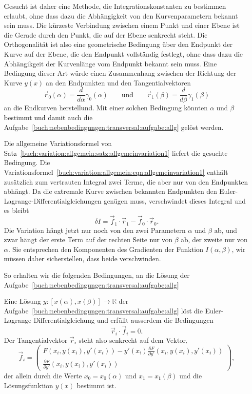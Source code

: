 Gesucht ist daher eine Methode, die Integrationskonstanten zu bestimmen
erlaubt, ohne dass dazu die Abhängigkeit von den Kurvenparametern bekannt
sein muss.
Die kürzeste Verbindung zwischen einem Punkt und einer Ebene ist die
Gerade durch den Punkt, die auf der Ebene senkrecht steht.
Die Orthogonalität ist also eine geometrische Bedingung über den Endpunkt
der Kurve auf der Ebene, die den Endpunkt vollständig festlegt, ohne dass
dazu die Abhängikgeit der Kurvenlänge vom Endpunkt bekannt sein muss.
Eine Bedingung dieser Art würde einen Zusammenhang zwischen der Richtung
der Kurve $y(x)$ an den Endpunkten und den Tangentialvektoren
\[
\vec{r}_0(\alpha)
=
\frac{d}{d\alpha}\gamma_0(\alpha)
\qquad\text{und}\qquad
\vec{r}_1(\beta)
=
\frac{d}{d\beta}\gamma_1(\beta)
\]
an die Endkurven herstellund.
Mit einer solchen Bedingung könnten $\alpha$ und $\beta$ bestimmt und
damit auch die
Aufgabe~\ref{buch:nebenbedingungen:transversal:aufgabe:allg}
gelöst werden.

Die allgemeine Variationsformel von
Satz~\ref{buch:variation:allgemein:satz:allgemeinvariation1}
liefert die gesuchte Bedingung.
Die Variationsformel~\eqref{buch:variation:allgemein:eqn:allgemeinvariation1}
enthält zusätzlich zum vertrauten Integral zwei Terme, die aber nur von
den Endpunkten abhängt.
Da die extremale Kurve zwischen bekannten Endpunkten den
Euler-Lagrange-Differentialgleichungen genügen muss, verschwindet dieses
Integral und es bleibt
\[
\delta I
=
\vec{f}_1\cdot\vec{r}_1 - \vec{f}_0\cdot\vec{r}_0.
\]
Die Variation hängt jetzt nur noch von den zwei Parametern
$\alpha$ und $\beta$ ab, und zwar hängt der erste Term auf der rechten
Seite nur von $\beta$ ab, der zweite nur von $\alpha$.
Sie entsprechen den Komponenten des Gradienten der Funktion
$I(\alpha,\beta)$, wir müssen daher sicherstellen, dass beide
verschwinden.

So erhalten wir die folgenden Bedingungen, an die Lösung der
Aufgabe~\ref{buch:nebenbedingungen:transversal:aufgabe:allg}

\begin{satz}[Transversalität]
\label{buch:nebenbedingungen:transversal:satz:transversal}
Eine Lösung $y\colon [x(\alpha),x(\beta)]\to \mathbb{R}$ der 
Aufgabe~\ref{buch:nebenbedingungen:transversal:aufgabe:allg}
löst die Euler-Lagrange-Differentialgleichung und erfüllt ausserdem
die Bedingungen
\begin{equation}
\vec{r}_i\cdot\vec{f}_i=0.
\end{equation}
Der Tangentialvektor $\vec{r}_i$ steht also senkrecht auf dem Vektor,
\begin{equation}
\vec{f}_i
=
\begin{pmatrix}
\displaystyle 
F(x_i, y(x_i),y'(x_i))-y'(x_i)\frac{\partial F}{\partial y'}(x_i,y(x_i),y'(x_i))
\\[3pt]
\displaystyle 
\frac{\partial F}{\partial y'}(x_i,y(x_i),y'(x_i))
\end{pmatrix},
\end{equation}
der allein durch die Werte $x_0 = x_0(\alpha)$ und $x_1=x_1(\beta)$
und die Lösungsfunktion $y(x)$ bestimmt ist.
\end{satz}


